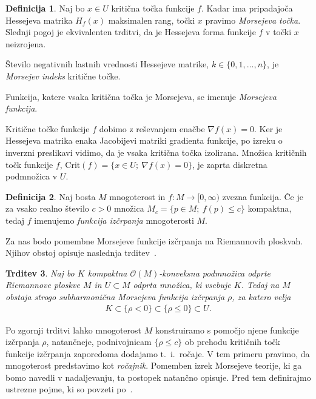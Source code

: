 \documentclass[12pt,a4paper,twoside]{article}
\theoremstyle{definition} %
\newtheorem{definicija}{Definicija}[section]
\theoremstyle{plain} %
\newtheorem{trditev}[definicija]{Trditev}
\numberwithin{equation}{section}  %
\begin{document}
\begin{definicija}
Naj bo $x \in U$ kritična točka funkcije $f$. Kadar ima pripadajoča Hessejeva matrika $H_{f}(x)$ maksimalen rang, točki $x$ pravimo \emph{Morsejeva točka}. Slednji pogoj je ekvivalenten trditvi, da je Hessejeva forma funkcije $f$ v točki $x$ neizrojena.

Število negativnih lastnih vrednosti Hessejeve matrike, $k \in \{0,1, \dots , n\}$, je \emph{Morsejev indeks} kritične točke.

Funkcija, katere vsaka kritična točka je Morsejeva, se imenuje \emph{Morsejeva funkcija}.
\end{definicija}

Kritične točke funkcije $f$ dobimo z reševanjem enačbe $\nabla f(x)=0$. Ker je Hessejeva matrika enaka Jacobijevi matriki gradienta funkcije, po izreku o inverzni preslikavi vidimo, da je vsaka kritična točka izolirana. Množica kritičnih točk funkcije $f$, $\text{Crit}(f) = \{ x \in U; \ \nabla f(x)=0 \}$, je zaprta diskretna podmnožica v $U$.

\begin{definicija}
Naj bosta $M$ mnogoterost in $f \colon M \to [0, \infty)$ zvezna funkcija. Če je za vsako realno število $c>0$ množica $M_{c} = \{ p \in M; \ f(p) \leq c \}$ kompaktna, tedaj $f$ imenujemo \emph{funkcija izčrpanja} mnogoterosti $M$.
\end{definicija}

Za nas bodo pomembne Morsejeve funkcije izčrpanja na Riemannovih ploskvah. Njihov obstoj opisuje naslednja trditev~\cite[Proposition~1.12.5]{alarcon2021minimal}.

\begin{trditev} \label{trd:Riem-ploskev-Morse-izcrpanje}
Naj bo $K$ kompaktna $\mathcal{O}(M)$-konveksna podmnožica odprte Riemannove ploskve $M$ in $U \subset M$ odprta množica, ki vsebuje $K$.
Tedaj na $M$ obstaja strogo subharmonična Morsejeva funkcija izčrpanja $\rho$, za katero velja 
\begin{gather*}
K \subset \{ \rho<0 \} \subset \{ \rho \leq 0 \} \subset U.
\end{gather*}
\end{trditev}

Po zgornji trditvi lahko mnogoterost $M$ konstruiramo s pomočjo njene funkcije izčrpanja $\rho$, natančneje, podnivojnicam $\{ \rho \leq c \}$ ob prehodu kritičnih točk funkcije izčrpanja zaporedoma dodajamo t.~i.~ročaje. V tem primeru pravimo, da mnogoterost predstavimo kot \emph{ročajnik}. Pomemben izrek Morsejeve teorije, ki ga bomo navedli v nadaljevanju, ta postopek natančno opisuje. Pred tem definirajmo ustrezne pojme, ki so povzeti po~\cite[Section~1.4]{alarcon2021minimal}.
\end{document}
